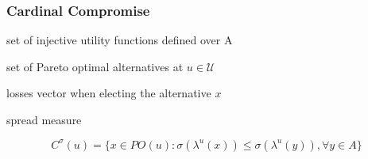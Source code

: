 \documentclass{beamer}
\newcommand{\paretopt}{\mathit{PO}}
\begin{document}
\begin{frame}
	\frametitle{Cardinal Compromise}
	\begin{description}[$PO(u) \qquad $]
		\item[$\mathcal{U}$] set of injective utility functions defined	over A
		\item[$PO(u)$] set of Pareto optimal alternatives at {\color{blue}$u \in \mathcal{U}$}
		\item[$\lambda ^{u}(x)$] losses vector when electing the alternative $x$
		\item[$\sigma$] spread measure
	\end{description}
	 \begin{block}{}
		\[ C^{\sigma }(u) = \{ x\in \paretopt(u):\sigma (\lambda ^{u}(x))\leq \sigma (\lambda ^{u}(y)),  \forall y\in A\} \]
	\end{block}
\end{frame}
\end{document}
